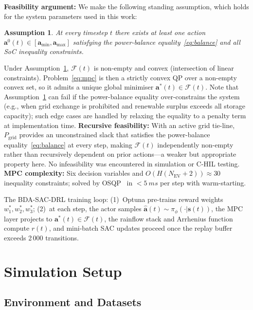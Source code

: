\documentclass[journal,10pt,twocolumn]{IEEEtran}
\newtheorem{assumption}{Assumption}
\begin{document}
\textbf{Feasibility argument:}
We make the following standing assumption, which holds for the system
parameters used in this work:
\begin{assumption}\label{ass:feas}
At every timestep $t$ there exists at least one action
$\mathbf{a}^0(t)\in[\mathbf{a}_{\min},\mathbf{a}_{\max}]$ satisfying
the power-balance equality~\eqref{eq:balance} and all SoC inequality
constraints.
\end{assumption}
Under Assumption~\ref{ass:feas}, $\mathcal{F}(t)$ is non-empty and
convex (intersection of linear constraints).
Problem~\eqref{eq:mpc} is then a strictly convex QP over a non-empty
convex set, so it admits a unique global minimiser $\mathbf{a}^*(t)
\in\mathcal{F}(t)$.
Note that Assumption~\ref{ass:feas} can fail if the power-balance
equality over-constrains the system (e.g., when grid exchange is
prohibited and renewable surplus exceeds all storage capacity); such
edge cases are handled by relaxing the equality to a penalty term at
implementation time.
\textbf{Recursive feasibility:} With an active grid tie-line,
$P_\mathrm{grid}$ provides an unconstrained slack that satisfies the
power-balance equality~\eqref{eq:balance} at every step, making
$\mathcal{F}(t)$ independently non-empty rather than recursively
dependent on prior actions---a weaker but appropriate property here.
No infeasibility was encountered in simulation or C-HIL testing.
\textbf{MPC complexity:} Six decision variables and
$O(H(N_\mathrm{EV}+2))\approx30$ inequality constraints; solved
by OSQP~\cite{osqp_2020} in $<\SI{5}{ms}$ per step with
warm-starting.

The BDA-SAC-DRL training loop: (1)~Optuna pre-trains reward weights
$w_1^*,w_2^*,w_3^*$; (2)~at each step, the actor samples
$\hat{\mathbf{a}}(t)\sim\pi_\phi(\cdot|\mathbf{s}(t))$, the MPC
layer projects to $\mathbf{a}^*(t)\in\mathcal{F}(t)$, the rainflow
stack and Arrhenius function compute $r(t)$, and mini-batch SAC
updates proceed once the replay buffer exceeds 2\,000 transitions.

\section{Simulation Setup}\label{sec:sim}

\subsection{Environment and Datasets}
\end{document}
